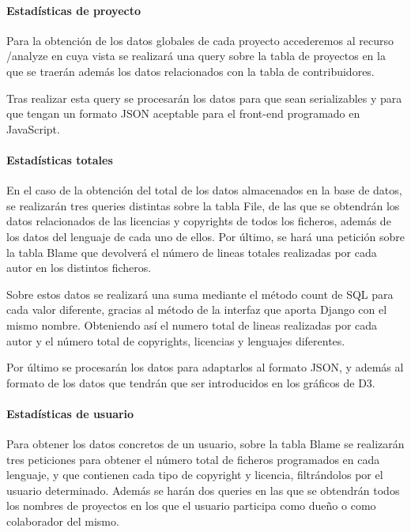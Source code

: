 \documentclass[a4paper, spanish, 12pt]{book}
\begin{document}
\paragraph*{Estad\'isticas de proyecto}
\label{paragraph:project_stats}

Para la obtenci\'on de los datos globales de cada proyecto accederemos al recurso
/analyze en cuya vista se realizar\'a una query sobre la tabla de proyectos en la
que se traer\'an adem\'as los datos relacionados con la tabla de contribuidores.

Tras realizar esta query se procesar\'an los datos para que sean serializables
y para que tengan un formato JSON aceptable para el front-end programado en JavaScript.

\paragraph*{Estad\'isticas totales}
\label{paragraph:total_stats}

En el caso de la obtenci\'on del total de los datos almacenados en la base de datos,
se realizar\'an tres queries distintas sobre la tabla File, de las que se obtendr\'an
los datos relacionados de las licencias y copyrights de todos los ficheros, adem\'as
de los datos del lenguaje de cada uno de ellos. Por \'ultimo, se har\'a una petici\'on sobre
la tabla Blame que devolver\'a el n\'umero de lineas totales realizadas por cada autor en
los distintos ficheros.

Sobre estos datos se realizar\'a una suma mediante el m\'etodo count de SQL para cada valor diferente,
gracias al m\'etodo de la interfaz que aporta Django con el mismo nombre. Obteniendo
as\'i el numero total de lineas realizadas por cada autor y el n\'umero total de
copyrights, licencias y lenguajes diferentes.

Por \'ultimo se procesar\'an los datos para adaptarlos al formato JSON, y adem\'as
al formato de los datos que tendr\'an que ser introducidos en los gr\'aficos de D3.

\paragraph*{Estad\'isticas de usuario}
\label{paragraph:user_stats}

Para obtener los datos concretos de un usuario, sobre la tabla Blame se realizar\'an
tres peticiones para obtener el n\'umero total de ficheros programados en cada lenguaje,
y que contienen cada tipo de copyright y licencia, filtr\'andolos por el usuario determinado.
Adem\'as se har\'an dos queries en las que se obtendr\'an todos los nombres de proyectos
en los que el usuario participa como due\~no o como colaborador del mismo.
\end{document}
